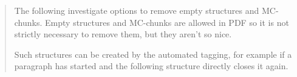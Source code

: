\documentclass{article}
\begin{document}
\begin{abstract}
The following investigate options to remove empty structures and MC-chunks.
Empty structures and MC-chunks are allowed in PDF so it is not strictly necessary to remove them, but they aren't so nice.

Such structures can be created by the automated tagging, for example if a paragraph has started and the following structure directly closes it again. 



\end{abstract}
\end{document}
